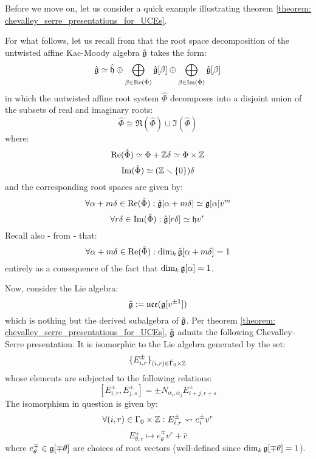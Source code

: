         Before we move on, let us consider a quick example illustrating theorem \ref{theorem: chevalley_serre_presentations_for_UCEs}.
        \begin{example}
            For what follows, let us recall from \cite[Chapter 7]{kac_infinite_dimensional_lie_algebras} that the root space decomposition of the untwisted affine Kac-Moody algebra $\hat{\mathfrak{g}}$ takes the form:
                $$\hat{\mathfrak{g}} \simeq \hat{\mathfrak{h}} \oplus \bigoplus_{\beta \in \operatorname{Re}(\hat{\Phi})} \hat{\mathfrak{g}}[\beta] \oplus \bigoplus_{\beta \in \operatorname{Im}(\hat{\Phi})} \hat{\mathfrak{g}}[\beta]$$
            in which the untwisted affine root system $\hat{\Phi}$ decomposes into a disjoint union of the subsets of real and imaginary roots:
                $$\hat{\Phi} \cong \Re(\hat{\Phi}) \cup \Im(\hat{\Phi})$$
            where:
                $$\Re(\hat{\Phi}) \cong \Phi + \Z\delta \cong \Phi \x \Z$$
                $$\operatorname{Im}(\hat{\Phi}) \simeq (\mathbb{Z} \smallsetminus \{0\})\delta$$
            and the corresponding root spaces are given by:
                $$\forall \alpha + m\delta \in \operatorname{Re}(\hat{\Phi}): \hat{\mathfrak{g}}[\alpha + m\delta] \simeq \mathfrak{g}[\alpha] v^m$$
                $$\forall r\delta \in \operatorname{Im}(\hat{\Phi}): \hat{\mathfrak{g}}[r\delta] \simeq \mathfrak{h} v^r$$
            Recall also - from \cite[Chapter 5]{kac_infinite_dimensional_lie_algebras} - that:
                $$\forall \alpha + m \delta \in \operatorname{Re}(\hat{\Phi}): \dim_k \hat{\mathfrak{g}}[\alpha + m\delta] = 1$$
            entirely as a consequence of the fact that $\dim_k \mathfrak{g}[\alpha] = 1$. 
        
            Now, consider the Lie algebra:
                $$\tilde{\mathfrak{g}} := \mathfrak{uce}(\mathfrak{g}[v^{\pm 1}])$$
            which is nothing but the derived subalgebra of $\hat{\mathfrak{g}}$. Per theorem \ref{theorem: chevalley_serre_presentations_for_UCEs}, $\tilde{\mathfrak{g}}$ admits the following Chevalley-Serre presentation. It is isomorphic to the Lie algebra generated by the set:
                $$\{ E_{i, r}^{\pm} \}_{(i, r) \in \hat{\Gamma}_0 \x \Z}$$
            whose elements are subjected to the following relations:
                $$[E_{i, r}^{\pm}, E_{j, s}^{\pm}] = \pm N_{\alpha_i, \alpha_j} E_{i + j, r + s}^{\pm}$$
            The isomorphism in question is given by:
                $$\forall (i, r) \in \Gamma_0 \x \Z: E_{i, r}^{\pm} \mapsto e_i^{\pm} v^r$$
                $$E_{\theta, r}^{\pm} \mapsto e_{\theta}^{\mp} v^r + \hat{c}$$
            where $e_{\theta}^{\mp} \in \mathfrak{g}[\mp \theta]$ are choices of root vectors (well-defined since $\dim_k \mathfrak{g}[\mp \theta] = 1$).
        \end{example}

